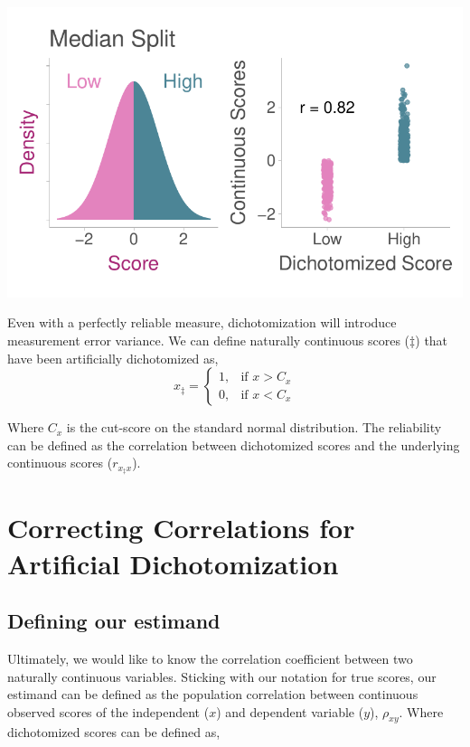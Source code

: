 \documentclass[
  letterpaper,
  DIV=11,
  numbers=noendperiod]{scrreprt}
\begin{document}
\includegraphics{artificial_dichotomization_files/figure-pdf/unnamed-chunk-1-1.pdf}

Even with a perfectly reliable measure, dichotomization will introduce
measurement error variance. We can define naturally continuous scores
(\(\ddagger\)) that have been artificially dichotomized as, \[
 x_\ddagger= 
\begin{cases}
    1,& \text{if } x>C_x\\
    0,& \text{if } x<C_x
\end{cases}
\]

Where \(C_x\) is the cut-score on the standard normal distribution. The
reliability can be defined as the correlation between dichotomized
scores and the underlying continuous scores (\(r_{x_\ddagger x}\)).

\hypertarget{correcting-correlations-for-artificial-dichotomization}{%
\section{Correcting Correlations for Artificial
Dichotomization}\label{correcting-correlations-for-artificial-dichotomization}}

\hypertarget{defining-our-estimand}{%
\subsection{Defining our estimand}\label{defining-our-estimand}}

Ultimately, we would like to know the correlation coefficient between
two naturally continuous variables. Sticking with our notation for true
scores, our estimand can be defined as the population correlation
between continuous observed scores of the independent (\(x\)) and
dependent variable (\(y\)), \(\rho_{xy}\). Where dichotomized scores can
be defined as,
\end{document}

